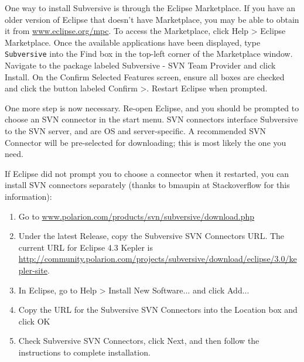 One way to install Subversive is through the Eclipse Marketplace.  If
you have an older version of Eclipse that doesn't have Marketplace,
you may be able to obtain it from
\href{http://www.eclipse.org/mpc/}{www.eclipse.org/mpc}.  To access
the Marketplace, click {\sf Help > Eclipse Marketplace}. Once the
available applications have been displayed, type {\tt Subversive} into
the {\sf Find} box in the top-left corner of the Marketplace
window. Navigate to the package labeled {\sf Subversive - SVN Team
Provider} and click {\sf Install}. On the {\sf Confirm Selected
Features} screen, ensure all boxes are checked and click the button
labeled {\sf Confirm >}. Restart Eclipse when prompted.

One more step is now necessary. Re-open Eclipse, and you should be
prompted to choose an SVN connector in the start menu.  SVN connectors
interface Subversive to the SVN server, and are OS and
server-specific. A recommended SVN Connector will be pre-selected for
downloading; this is most likely the one you need.

If Eclipse did not prompt you to choose a connector when it restarted,
you can install SVN connectors separately (thanks to bmaupin at
Stackoverflow for this information):

\begin{enumerate}

\item  Go to 
\href{http://www.polarion.com/products/svn/subversive/download.php}%
{www.polarion.com/products/svn/subversive/download.php}

\item Under the latest {\sf Release}, copy the Subversive SVN
Connectors URL. The current URL for Eclipse 4.3 Kepler
is \href{http://community.polarion.com/projects/subversive/download/eclipse/3.0/kepler-site/}%
{http://community.polarion.com/projects/subversive/download/eclipse/3.0/kepler-site}.

\item In Eclipse, go to {\sf Help > Install New Software...} and 
click {\sf Add...}  

\item Copy the URL for the Subversive SVN Connectors into the {\sf
Location} box and click {\sf OK}

\item Check {\sf Subversive SVN Connectors}, click {\sf Next}, and
then follow the instructions to complete installation.

\end{enumerate}

